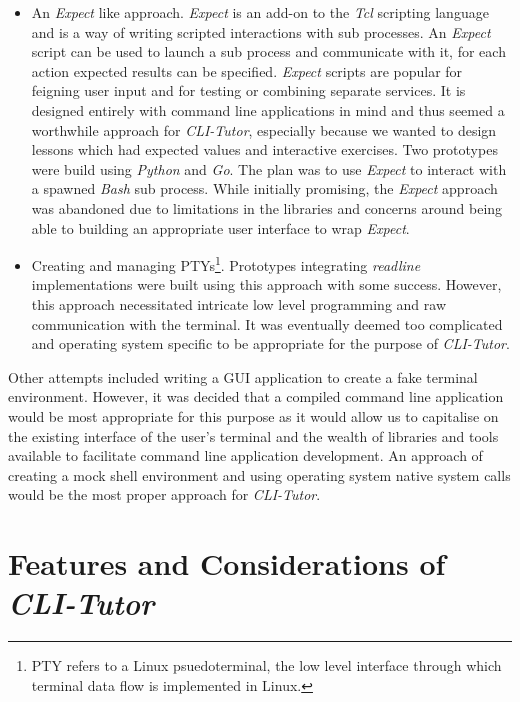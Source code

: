 \begin{itemize} \item An \textit{Expect}\cite{libes1995exploring} like
    approach. \textit{Expect} is an add-on to the \textit{Tcl} scripting
    language and is a way of writing scripted interactions with sub processes.
    An \textit{Expect} script can be used to launch a sub process and
    communicate with it, for each action expected results can be specified.
    \textit{Expect} scripts are popular for feigning user input and for testing
    or combining separate services. It is designed entirely with command line
    applications in mind and thus seemed a worthwhile approach for
    \textit{CLI-Tutor}, especially because we wanted to design lessons which
    had expected values and interactive exercises. Two prototypes were build
    using  \textit{Python} and \textit{Go}. The plan was to use \textit{Expect}
    to interact with a spawned \textit{Bash} sub process. While initially
    promising, the \textit{Expect} approach was abandoned due to limitations in
    the libraries and concerns around being able to building an appropriate
    user interface to wrap \textit{Expect}.

    \item Creating and managing PTYs\footnote{PTY refers to a Linux
        psuedoterminal, the low level interface through which terminal data
    flow is implemented in Linux.}. Prototypes integrating \textit{readline}
    implementations were built using this approach with some success. However,
    this approach necessitated intricate low level programming and raw
    communication with the terminal. It was eventually deemed too complicated
    and operating system specific to be appropriate for the purpose of
    \textit{CLI-Tutor}. \end{itemize}

    Other attempts included writing a GUI application to create a fake terminal
    environment. However, it was decided that a compiled command line
    application would be most appropriate for this purpose as it would allow us
    to capitalise on the existing interface of the user's terminal and the
    wealth of libraries and tools available to facilitate command line
    application development. An approach of creating a mock shell environment
    and using operating system native system calls would be the most proper
    approach for \textit{CLI-Tutor}.

\section{Features and Considerations of \textit{CLI-Tutor}}

